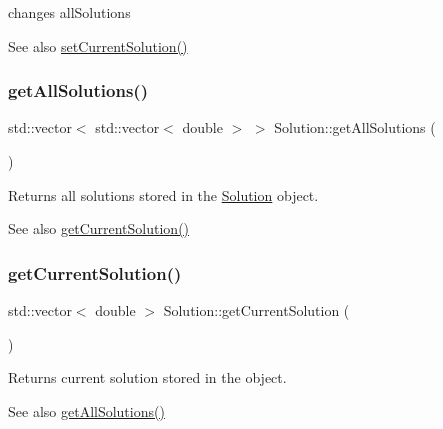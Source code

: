 changes all\+Solutions \begin{DoxySeeAlso}{See also}
\hyperlink{class_solution_a32dad1b34b687cb439a2a60881e50402}{set\+Current\+Solution()} 
\end{DoxySeeAlso}
\mbox{\label{class_solution_abd28abd062adb793866fd5e1c8ef8639}} 
\subsubsection{\texorpdfstring{get\+All\+Solutions()}{getAllSolutions()}}
{\footnotesize\ttfamily std\+::vector$<$ std\+::vector$<$ double $>$ $>$ Solution\+::get\+All\+Solutions (\begin{DoxyParamCaption}{ }\end{DoxyParamCaption})}

Returns all solutions stored in the \hyperlink{class_solution}{Solution} object. \begin{DoxySeeAlso}{See also}
\hyperlink{class_solution_ae92d4a6070f6e5879698754fa5547ee3}{get\+Current\+Solution()} 
\end{DoxySeeAlso}
\mbox{\label{class_solution_ae92d4a6070f6e5879698754fa5547ee3}} 
\subsubsection{\texorpdfstring{get\+Current\+Solution()}{getCurrentSolution()}}
{\footnotesize\ttfamily std\+::vector$<$ double $>$ Solution\+::get\+Current\+Solution (\begin{DoxyParamCaption}{ }\end{DoxyParamCaption})}

Returns current solution stored in the object. \begin{DoxySeeAlso}{See also}
\hyperlink{class_solution_abd28abd062adb793866fd5e1c8ef8639}{get\+All\+Solutions()} 
\end{DoxySeeAlso}
\mbox{\label{class_solution_a32dad1b34b687cb439a2a60881e50402}} 
